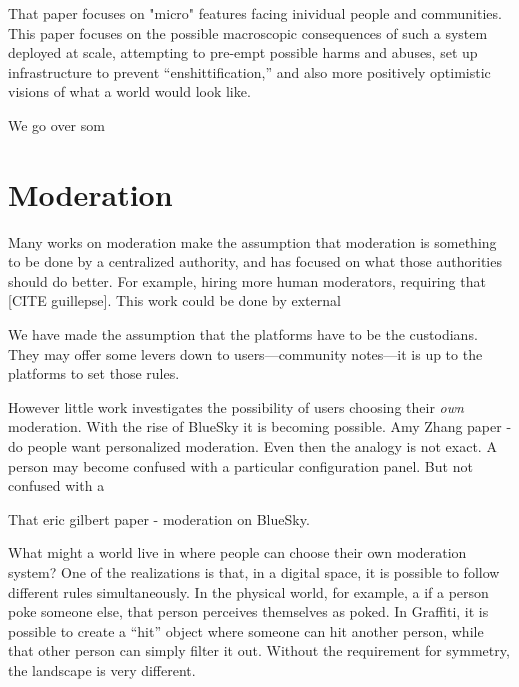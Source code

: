That paper focuses on "micro" features facing inividual people
and communities. This paper focuses on the possible macroscopic
consequences of such a system deployed at scale, attempting to
pre-empt possible harms and abuses, set up infrastructure to
prevent ``enshittification,'' and also more positively optimistic
visions of what a world would look like.




We go over som

\section{Moderation}

Many works on moderation make the assumption that moderation is something
to be done by a centralized authority, and has focused on what those authorities
should do better. For example, hiring more human moderators, requiring that
[CITE guillepse]. This work could be done by external

We have made the assumption that the platforms have to be the custodians.
They may offer some levers down to users---community notes---it is up to
the platforms to set those rules.

However little work investigates the possibility of users choosing their \emph{own}
moderation. With the rise of BlueSky it is becoming possible.
Amy Zhang paper - do people want personalized moderation.
Even then the analogy is not exact.
A person may become confused with a particular configuration panel.
But not confused with a

That eric gilbert paper - moderation on BlueSky.

What might a world live in where people can choose their own moderation system?
One of the realizations is that, in a digital space, it is possible to follow different
rules simultaneously. In the physical world, for example,
a if a person poke someone else, that person perceives themselves as poked.
In Graffiti, it is possible to create a ``hit'' object where someone can hit another person,
while that other person can simply filter it out. Without the requirement for
symmetry, the landscape is very different.

